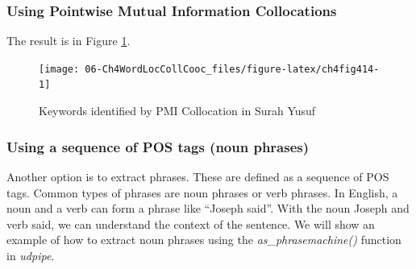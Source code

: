 \documentclass[
]{article}
\newenvironment{Shaded}{\begin{snugshade}}{\end{snugshade}}
\newcommand{\AttributeTok}[1]{\textcolor[rgb]{0.13,0.29,0.53}{#1}}
\newcommand{\FunctionTok}[1]{\textcolor[rgb]{0.13,0.29,0.53}{\textbf{#1}}}
\newcommand{\NormalTok}[1]{#1}
\newcommand{\OtherTok}[1]{\textcolor[rgb]{0.56,0.35,0.01}{#1}}
\newcommand{\SpecialCharTok}[1]{\textcolor[rgb]{0.81,0.36,0.00}{\textbf{#1}}}
\newcommand{\StringTok}[1]{\textcolor[rgb]{0.31,0.60,0.02}{#1}}
\begin{document}
\hypertarget{using-pointwise-mutual-information-collocations}{%
\subsubsection{Using Pointwise Mutual Information Collocations}\label{using-pointwise-mutual-information-collocations}}

The result is in Figure \ref{fig:ch4fig414}.

\scriptsize

\begin{Shaded}
\end{Shaded}

\normalsize

\begin{figure}

{\centering \texttt{[image: 06-Ch4WordLocCollCooc\_files/figure-latex/ch4fig414-1]} 

}

\caption{Keywords identified by PMI Collocation in Surah Yusuf}\label{fig:ch4fig414}
\end{figure}

\hypertarget{using-a-sequence-of-pos-tags-noun-phrases}{%
\subsubsection{Using a sequence of POS tags (noun phrases)}\label{using-a-sequence-of-pos-tags-noun-phrases}}

Another option is to extract phrases. These are defined as a sequence of POS tags. Common types of phrases are noun phrases or verb phrases. In English, a noun and a verb can form a phrase like ``Joseph said''. With the noun Joseph and verb said, we can understand the context of the sentence. We will show an example of how to extract noun phrases using the \emph{as\_phrasemachine()} function in \emph{udpipe}.
\end{document}
